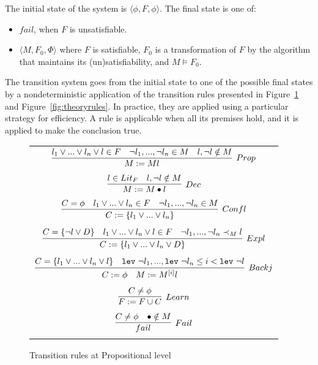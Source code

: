 \documentclass{article}
\begin{document}
	The initial state of the system is 
	$\langle \phi, F, \phi \rangle$. 
	The final state is one of:
	\begin{itemize}
		\item $fail$, when $F$ is 
		unsatisfiable.
		\item $\langle M, F_0, \Phi \rangle$ 
		where $F$ is satisfiable, $F_0$ is 
		a transformation of $F$ by the 
		algorithm that maintains its 
		(un)satisfiability,	and $M 
		\models F_0$.
	\end{itemize}
	
	The transition system goes from the 
	initial state to one of the possible 
	final states by a nondeterministic 
	application of the transition rules 
	presented in Figure~\ref{fig:proprules} 
	and Figure~\ref{fig:theoryrules}. In 
	practice, they are applied using a 
	particular strategy for efficiency.
	A rule is applicable when all its 
	premises hold, and it is applied to 
	make the conclusion true. 

	\begin{figure}[t]
	\centering
	\begin{framed}
	\begin{tabular}{c}
		$\infer[Prop]{M := Ml}{l_1 \lor ... \lor 
			l_n \lor l \in F & \neg l_1,...,\neg 
			l_n \in M & l, \neg l \notin M}$ \\ \\
		$\infer[Dec]{M := M \bullet l}{l \in 
			Lit_F & l, \neg l \notin 
			M}$ \\ \\
		$\infer[Confl]{C:=\{l_1 \lor ... \lor 
			l_n\}}{C = \phi & l_1 \lor ... \lor 
			l_n \in F & \neg l_1,...,\neg l_n \in 
			M}$ \\ \\
		$\infer[Expl]{C := \{l_1 \lor ... \lor 
			l_n \lor D\}}{C = \{\neg l \lor D\} & 
			l_1 \lor ... \lor l_n \lor l \in F & 
			\neg l_1,...,\neg l_n \prec_M l}$ \\ \\
		$\infer[Backj]{C := \phi\ \ \ M := M^{[i]}l}
		{C = \{l_1 \lor ... \lor l_n \lor l\} & 
			\texttt{lev}\ \neg l_1, ... , 
			\texttt{lev}\ \neg l_n \leq 
			i < \texttt{lev}\ \neg l}$ \\ \\
		$\infer[Learn]{F := F \cup C}{C \neq 
			\phi}$ \\ \\
		$\infer[Fail]{fail}{C \neq \phi & \bullet 
			\notin M}$ \\ \\
	\end{tabular}
	\end{framed}
	\caption{Transition rules at Propositional level}
	\label{fig:proprules}
	\end{figure}
\end{document}
